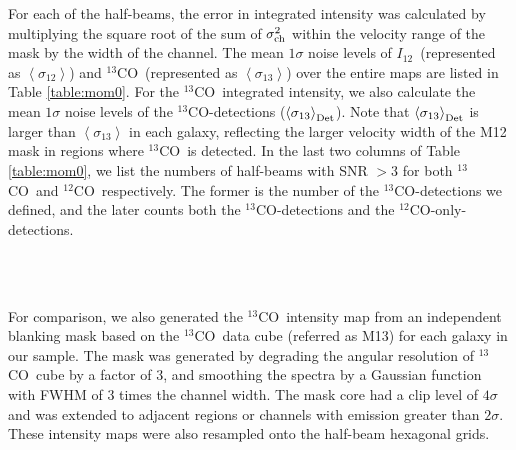 \documentclass{emulateapj}
\def\ttco{\mbox{$^{13}$CO}}
\def\twco{\mbox{$^{12}$CO}}
\def\itw{$I_{12}$}
\begin{document}
For each of the half-beams, 
the error in integrated intensity was calculated  
by multiplying the square root of the sum of 
$\sigma_{\rm ch}^2$ within the velocity range of the mask 
by the width of the channel.  
The mean $1\sigma$ noise levels of \itw \ (represented as 
$\left<\sigma_{12}\right>$) and 
\ttco \ (represented as $\left<\sigma_{13}\right>$) over the entire maps are listed in Table
\ref{table:mom0}.  
For the \ttco \ integrated intensity, we also calculate the mean $1\sigma$
noise levels of the \ttco-detections 
($\left<\sigma_{13}\right>_{\rm Det}$). 
Note that $\left<\sigma_{13}\right>_{\rm Det}$ is larger than 
$\left<\sigma_{13}\right>$ in each galaxy, 
reflecting the larger velocity width of the M12 mask in
regions where \ttco \ is detected. 
In the last two columns of Table \ref{table:mom0}, we list 
the numbers of half-beams with SNR $>3$ for both \ttco \ and \twco \ respectively.  
The former is the number of the \ttco-detections we defined, and 
the later counts both the \ttco-detections and the 
\twco-only-detections. 


\begin{figure*}
\hspace{0.7cm}
\\
\\
\vspace{-0.3cm}
\caption{Comparisons of \ttco \ maps generated by different masks 
for NGC 3147 and NGC 4654. 
\textit{Left}: \ttco \ integrated intensity map derived with the \twco \ mask (M12);
contours levels are SNR of \ttco \ at [3,6,9].
\textit{Middle}: \ttco \ integrated intensity map derived with the \ttco \ mask
(M13); contours levels are SNR of [3,6,9].
\textit{Right}: Comparison of \ttco \  intensities from M12 and M13 as functions 
of \twco \ intensities. 
Maps from different masks show similar morphologies and distributions 
of \ttco \ intensity.}
\label{fig:13comp}
\end{figure*}

For comparison, we also generated the \ttco \ intensity map 
from an independent blanking mask based on the \ttco \ data cube
(referred as M13) for each galaxy in our sample.
The mask was generated by degrading the angular resolution 
of \ttco \ cube by a factor of $3$, 
and smoothing the spectra by a Gaussian function 
with FWHM of $3$ times the channel width. 
The mask core had a clip level of $4 \sigma$ and 
was extended to adjacent regions or channels 
with emission greater than $2 \sigma$.
These intensity maps were also resampled onto the half-beam hexagonal grids.
\end{document}
